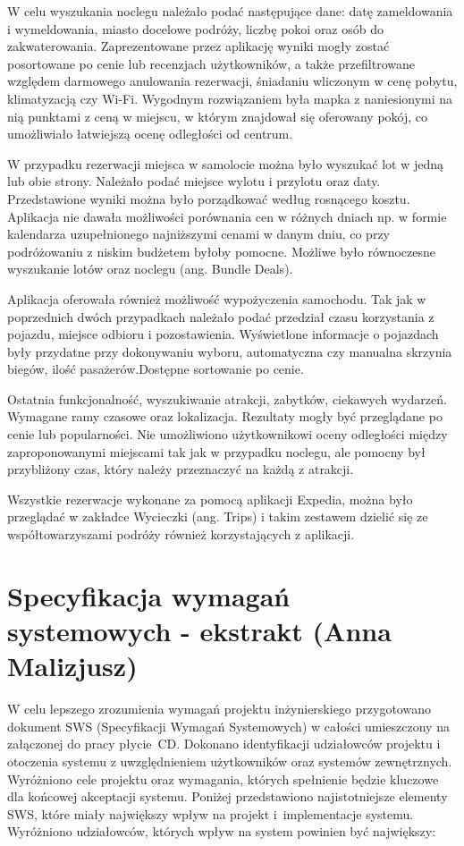 \documentclass[10pt,twoside,a4paper]{report}
\begin{document}
\par W celu wyszukania noclegu należało podać następujące dane: datę zameldowania i wymeldowania, miasto docelowe podróży, liczbę pokoi oraz osób do zakwaterowania. Zaprezentowane przez aplikację wyniki mogły zostać posortowane po cenie lub recenzjach użytkowników, a także przefiltrowane względem darmowego anulowania rezerwacji, śniadaniu wliczonym w cenę pobytu, klimatyzacją czy Wi-Fi. Wygodnym rozwiązaniem była mapka z naniesionymi na nią punktami z ceną w miejscu, w którym znajdował się oferowany pokój, co umożliwiało łatwiejszą ocenę odległości od centrum.
\par W przypadku rezerwacji miejsca w samolocie można było wyszukać lot w jedną lub obie strony. Należało podać miejsce wylotu i przylotu oraz daty. Przedstawione wyniki można było porządkować według rosnącego kosztu. Aplikacja nie dawała możliwości porównania cen w różnych dniach np. w formie kalendarza uzupełnionego najniższymi cenami w danym dniu, co przy podróżowaniu z niskim budżetem byłoby pomocne. Możliwe było równoczesne wyszukanie lotów oraz noclegu (ang. Bundle Deals).
\par Aplikacja oferowała również możliwość wypożyczenia samochodu. Tak jak w poprzednich dwóch przypadkach należało podać przedział czasu korzystania z pojazdu, miejsce odbioru i pozostawienia. Wyświetlone informacje o pojazdach były przydatne przy dokonywaniu wyboru, automatyczna czy manualna skrzynia biegów, ilość pasażerów.Dostępne sortowanie po cenie.
\par Ostatnia funkcjonalność, wyszukiwanie atrakcji, zabytków, ciekawych wydarzeń. Wymagane ramy czasowe oraz lokalizacja. Rezultaty mogły być przeglądane po cenie lub popularności. Nie umożliwiono użytkownikowi oceny odległości między zaproponowanymi miejscami tak jak w przypadku noclegu, ale pomocny był przybliżony czas, który należy przeznaczyć na każdą z atrakcji.
\par Wszystkie rezerwacje wykonane za pomocą aplikacji Expedia, można było przeglądać w zakładce Wycieczki (ang. Trips) i takim zestawem dzielić się ze współtowarzyszami podróży również korzystających z aplikacji.

\chapter{Specyfikacja wymagań systemowych - ekstrakt (Anna Malizjusz)}
\par W celu lepszego zrozumienia wymagań projektu inżynierskiego przygotowano dokument SWS (Specyfikacji Wymagań Systemowych) w całości umieszczony na załączonej do pracy płycie~CD. Dokonano identyfikacji udziałowców projektu i otoczenia systemu z uwzględnieniem użytkowników oraz systemów zewnętrznych. Wyróżniono cele projektu oraz wymagania, których spełnienie będzie kluczowe dla końcowej akceptacji systemu. Poniżej przedstawiono najistotniejsze elementy SWS, które miały największy wpływ na projekt i~implementacje systemu.
\newline
\newline
\noindent Wyróżniono udziałowców, których wpływ na system powinien być największy:
\end{document}
